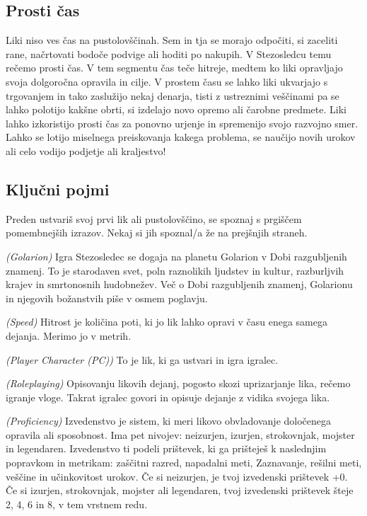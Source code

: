 \subsection{Prosti čas}
Liki niso ves čas na pustolovščinah. Sem in tja se morajo odpočiti, si zaceliti rane, načrtovati bodoče podvige ali hoditi po nakupih. V Stezosledcu temu rečemo prosti čas. V tem segmentu čas teče hitreje, medtem ko liki opravljajo svoja dolgoročna opravila in cilje. V prostem času se lahko liki ukvarjajo s trgovanjem in tako zaslužijo nekaj denarja, tisti z ustreznimi veščinami pa se lahko polotijo kakšne obrti, si izdelajo novo opremo ali čarobne predmete. Liki lahko izkoristijo prosti čas za ponovno urjenje in spremenijo svojo razvojno smer. Lahko se lotijo miselnega preiskovanja kakega problema, se naučijo novih urokov ali celo vodijo podjetje ali kraljestvo!

\subsection{Ključni pojmi}

Preden ustvariš svoj prvi lik ali pustolovščino, se spoznaj s prgiščem pomembnejših izrazov. Nekaj si jih spoznal/a že na prejšnjih straneh.

\newcommand{\rpgterm}[3]{%
    \begin{description}[leftmargin=!, labelwidth=20pt]
        \item[#1] \textit{(#2)} #3
    \end{description}}

\rpgterm{Golarion}{Golarion}{Igra Stezosledec se dogaja na planetu Golarion v Dobi razgubljenih znamenj. To je starodaven svet, poln raznolikih ljudstev in kultur, razburljvih krajev in smrtonosnih hudobnežev. Več o Dobi razgubljenih znamenj, Golarionu in njegovih božanstvih piše v osmem poglavju.}

\rpgterm{Hitrost}{Speed}{Hitrost je količina poti, ki jo lik 
lahko opravi v času enega samega dejanja. Merimo jo v metrih.}

\rpgterm{Igrani lik}{Player Character (PC)}{To je lik, ki ga ustvari in igra igralec.}

\rpgterm{Igranje vlog}{Roleplaying}{Opisovanju likovih dejanj, pogosto skozi uprizarjanje lika, rečemo igranje vloge. Takrat igralec govori in opisuje dejanje z vidika svojega lika.}

\rpgterm{Izvedenstvo}{Proficiency}{Izvedenstvo je sistem, ki meri likovo obvladovanje določenega opravila ali sposobnost. Ima pet nivojev: neizurjen, izurjen, strokovnjak, mojster in legendaren. Izvedenstvo ti podeli prištevek, ki ga prišteješ k naslednjim popravkom in metrikam: zaščitni razred, napadalni meti, Zaznavanje, rešilni meti, veščine in učinkovitost urokov. Če si neizurjen, je tvoj izvedenski prištevek +0. Če si izurjen, strokovnjak, mojster ali legendaren, tvoj izvedenski prištevek šteje 2, 4, 6 in 8, v tem vrstnem redu.}

